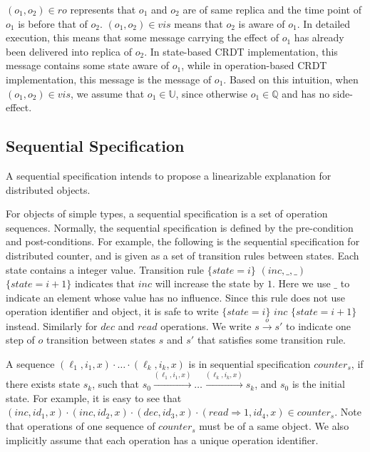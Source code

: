 {$(o_1,o_2) \in \mathit{ro}$ represents that $o_1$ and $o_2$ are of same replica and the time point of $o_1$ is before that of $o_2$. $(o_1,o_2) \in \mathit{vis}$ means that $o_2$ is aware of $o_1$. In detailed execution, this means that some message carrying the effect of $o_1$ has already been delivered into replica of $o_2$. In state-based CRDT implementation, this message contains some state aware of $o_1$, while in operation-based CRDT implementation, this message is the message of $o_1$. Based on this intuition, when $(o_1,o_2) \in \mathit{vis}$, we assume that $o_1 \in \mathbb{U}$, since otherwise $o_1 \in \mathbb{Q}$ and has no side-effect.

\subsection{Sequential Specification}
\label{subsec:sequential specification}

A sequential specification intends to propose a linearizable explanation for distributed objects.

For objects of simple types, a sequential specification is a set of operation sequences. Normally, the sequential specification is defined by the pre-condition and post-conditions. For example, the following is the sequential specification for distributed counter, and is given as a set of transition rules between states. Each state contains a integer value. Transition rule $\{ \mathit{state} = i \}$ $(\mathit{inc},\_,\_)$ $\{ \mathit{state} = i+1 \}$ indicates that $\mathit{inc}$ will increase the state by $1$. Here we use $\_$ to indicate an element whose value has no influence. Since this rule does not use operation identifier and object, it is safe to write $\{ \mathit{state} = i \}$ $\mathit{inc}$ $\{ \mathit{state} = i+1 \}$ instead. Similarly for $\mathit{dec}$ and $\mathit{read}$ operations. We write $s {\xrightarrow{o}} s'$ to indicate one step of $o$ transition between states $s$ and $s'$ that satisfies some transition rule.

A sequence $(\ell_1,i_1,x) \cdot \ldots \cdot (\ell_k,i_k,x)$ is in sequential specification $\mathit{counter}_s$, if there exists state $s_k$, such that $s_0 {\xrightarrow{(\ell_1,i_1,x)}} \ldots {\xrightarrow{(\ell_k,i_k,x)}} s_k$, and $s_0$ is the initial state. For example, it is easy to see that $(\mathit{inc},\mathit{id}_1,x) \cdot (\mathit{inc},\mathit{id}_2,x) \cdot (\mathit{dec},\mathit{id}_3,x) \cdot (\mathit{read} \Rightarrow 1,\mathit{id}_4,x) \in \mathit{counter}_s$. Note that operations of one sequence of $\mathit{counter}_s$ must be of a same object. We also implicitly assume that each operation has a unique operation identifier.


}
